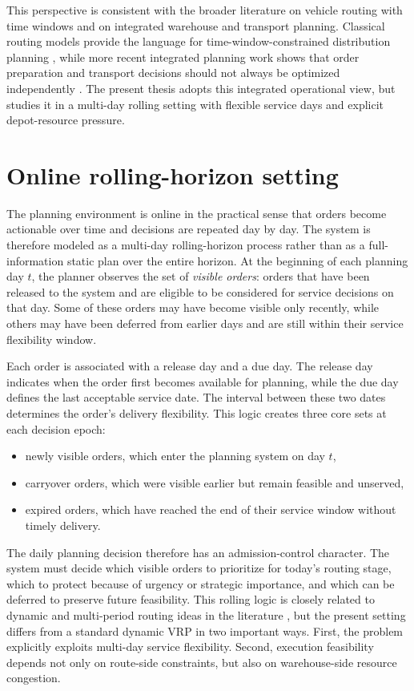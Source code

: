 This perspective is consistent with the broader literature on vehicle routing with time windows and on integrated warehouse and transport planning. Classical routing models provide the language for time-window-constrained distribution planning \cite{solomon1987vrptw}, while more recent integrated planning work shows that order preparation and transport decisions should not always be optimized independently \cite{vangils2018review,vangils2021integratedpickroute}. The present thesis adopts this integrated operational view, but studies it in a multi-day rolling setting with flexible service days and explicit depot-resource pressure.

\section{Online rolling-horizon setting}

The planning environment is online in the practical sense that orders become actionable over time and decisions are repeated day by day. The system is therefore modeled as a multi-day rolling-horizon process rather than as a full-information static plan over the entire horizon. At the beginning of each planning day $t$, the planner observes the set of \emph{visible orders}: orders that have been released to the system and are eligible to be considered for service decisions on that day. Some of these orders may have become visible only recently, while others may have been deferred from earlier days and are still within their service flexibility window.

Each order is associated with a release day and a due day. The release day indicates when the order first becomes available for planning, while the due day defines the last acceptable service date. The interval between these two dates determines the order's delivery flexibility. This logic creates three core sets at each decision epoch:
\begin{itemize}
    \item newly visible orders, which enter the planning system on day $t$,
    \item carryover orders, which were visible earlier but remain feasible and unserved,
    \item expired orders, which have reached the end of their service window without timely delivery.
\end{itemize}

The daily planning decision therefore has an admission-control character. The system must decide which visible orders to prioritize for today's routing stage, which to protect because of urgency or strategic importance, and which can be deferred to preserve future feasibility. This rolling logic is closely related to dynamic and multi-period routing ideas in the literature \cite{pillac2013dvrp,francis2008pvrp,kovacs2014multiperiod}, but the present setting differs from a standard dynamic VRP in two important ways. First, the problem explicitly exploits multi-day service flexibility. Second, execution feasibility depends not only on route-side constraints, but also on warehouse-side resource congestion.

